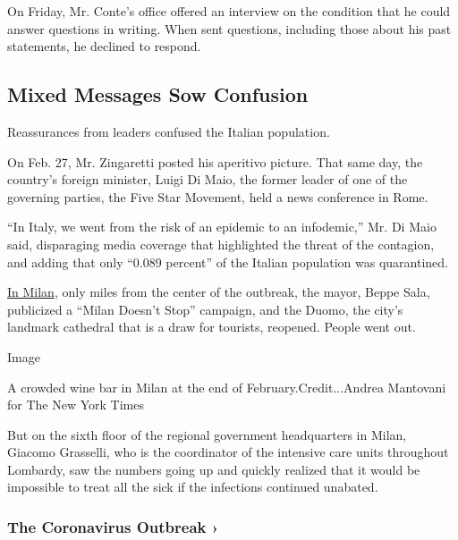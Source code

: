 On Friday, Mr. Conte's office offered an interview on the condition that
he could answer questions in writing. When sent questions, including
those about his past statements, he declined to respond.

\hypertarget{mixed-messages-sow-confusion}{%
\subsection{Mixed Messages Sow
Confusion}\label{mixed-messages-sow-confusion}}

Reassurances from leaders confused the Italian population.

On Feb. 27, Mr. Zingaretti posted his aperitivo picture. That same day,
the country's foreign minister, Luigi Di Maio, the former leader of one
of the governing parties, the Five Star Movement, held a news conference
in Rome.

``In Italy, we went from the risk of an epidemic to an infodemic,'' Mr.
Di Maio said, disparaging media coverage that highlighted the threat of
the contagion, and adding that only ``0.089 percent'' of the Italian
population was quarantined.

\href{https://www.nytimes3xbfgragh.onion/2020/02/27/world/europe/milan-coronavirus.html?searchResultPosition=6}{In
Milan}, only miles from the center of the outbreak, the mayor, Beppe
Sala, publicized a ``Milan Doesn't Stop'' campaign, and the Duomo, the
city's landmark cathedral that is a draw for tourists, reopened. People
went out.

Image

A crowded wine bar in Milan at the end of February.Credit...Andrea
Mantovani for The New York Times

But on the sixth floor of the regional government headquarters in Milan,
Giacomo Grasselli, who is the coordinator of the intensive care units
throughout Lombardy, saw the numbers going up and quickly realized that
it would be impossible to treat all the sick if the infections continued
unabated.

\href{https://www.nytimes3xbfgragh.onion/news-event/coronavirus?action=click\&pgtype=Article\&state=default\&region=MAIN_CONTENT_3\&context=storylines_faq}{}

\hypertarget{the-coronavirus-outbreak-}{%
\subsubsection{The Coronavirus Outbreak
›}\label{the-coronavirus-outbreak-}}

